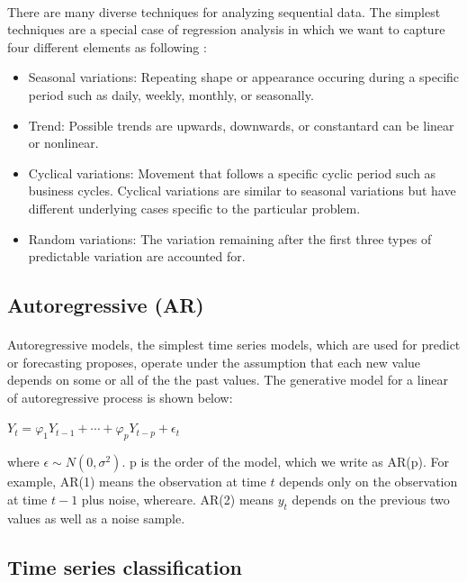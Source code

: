 \paragraph{}
There are many diverse techniques for analyzing sequential data. The simplest techniques are a special case of regression analysis in which we want to capture four different elements as following \cite{dash_2020}:
\begin{itemize}
\item Seasonal variations: Repeating shape or appearance occuring during a specific period such as daily, weekly, monthly, or seasonally.
\item Trend: Possible trends are upwards, downwards, or constantard can be linear or nonlinear.
\item Cyclical variations: Movement that follows a specific cyclic period such as business cycles. Cyclical variations are similar to seasonal variations but have different underlying cases specific to the particular problem.
\item Random variations: The variation remaining after the first three types of predictable variation are accounted for.
\end{itemize}

\subsection{Autoregressive (AR)}
\paragraph{}
Autoregressive models, the simplest time series models, which are used for predict or forecasting proposes, operate under the assumption that each new value depends on some or all of the the past values. The generative model for a linear of autoregressive process is shown below:

\hfil $Y_t = \varphi_1Y_{t-1} + \cdots + \varphi_pY_{t-p} + \epsilon_t $ \par 

where $\epsilon \sim N(0, \sigma^2)$. p is the order of the model, which we write as AR(p). For example, AR(1) means the observation at time $t$ depends only on the observation at time $t-1$ plus noise, whereare. AR(2) means $y_t$ depends on the previous two values as well as a noise sample.

\subsection{Time series classification}

